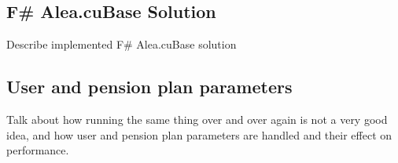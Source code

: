 \subsection{F\# Alea.cuBase Solution}
Describe implemented F\# Alea.cuBase solution

\subsection{User and pension plan parameters}
Talk about how running the same thing over and over again is not a very good idea, and how user and pension plan parameters are handled and their effect on performance.